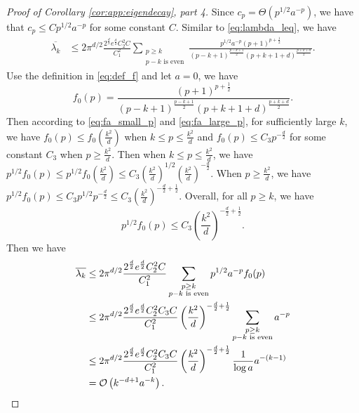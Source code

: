 \begin{proof}[Proof of Corollary \ref{cor:app:eigendecay}, part 4]
Since $c_p = \Theta(p^{1/2} a^{-p})$, 
 we have that $c_p\leq C p^{1/2} a^{-p}$ for some constant $C$. 
Similar to \eqref{eq:lambda_leq}, we have
\begin{align}
\overline{\lambda_k} 
&\leq 2\pi^{d/2}\frac{2^{\frac{d}{2}}e^{\frac{d}{2}}C_2^2C}{C_1^2}\sum_{\substack{p\geq k\\p-k\text{ is even}}} \frac{  p^{1/2} a^{-p}\left({p+1}\right)^{p+\frac{1}{2}}}{\left({p-k+1}\right)^{\frac{p-k+1}{2}}\left({p+k+1+d}\right)^{\frac{p+k+d}{2}}}.
\end{align}
Use the definition in \eqref{eq:def_f} and let $a=0$, we have
\begin{equation}
f_0(p)=\frac{\left({p+1}\right)^{p+\frac{1}{2}}}{\left({p-k+1}\right)^{\frac{p-k+1}{2}}\left({p+k+1+d}\right)^{\frac{p+k+d}{2}}}. 
\end{equation}
Then according to \eqref{eq:fa_small_p} and \eqref{eq:fa_large_p}, for sufficiently large $k$, we have $f_0(p)\leq f_0\left(\frac{k^2}{d}\right)$ when $k\leq p \leq \frac{k^2}{d}$ and $f_0(p)\leq C_3p^{-\frac{d}{2}}$ for some constant $C_3$ when $p\geq \frac{k^2}{d}$. Then when $k\leq p \leq \frac{k^2}{d}$, we have $p^{1/2}f_0(p)\leq p^{1/2} f_0\left(\frac{k^2}{d}\right)\leq C_3 \left(\frac{k^2}{d}\right)^{1/2} \left(\frac{k^2}{d}\right)^{-\frac{d}{2}}$. When $p\geq \frac{k^2}{d}$, we have $p^{1/2}f_0(p)\leq C_3 p^{1/2}p^{-\frac{d}{2}}\leq C_3\left(\frac{k^2}{d}\right)^{-\frac{d}{2}+\frac{1}{2}}$. Overall, for all $p\geq k$, we have
\begin{equation}
p^{1/2}f_0(p)\leq  C_3 \left(\frac{k^2}{d}\right)^{-\frac{d}{2}+\frac{1}{2}}.
\end{equation}
Then we have 
\begin{align}
\overline{\lambda_k} 
&\leq 2\pi^{d/2}\frac{2^{\frac{d}{2}}e^{\frac{d}{2}}C_2^2C}{C_1^2}\sum_{\substack{p\geq k\\p-k\text{ is even}}} p^{1/2} a^{-p}f_0(p)\\
&\leq 2\pi^{d/2}\frac{2^{\frac{d}{2}}e^{\frac{d}{2}}C_2^2C_3C}{C_1^2}\left(\frac{k^2}{d}\right)^{-\frac{d}{2}+\frac{1}{2}}\sum_{\substack{p\geq k\\p-k\text{ is even}}}  a^{-p}\\
&\leq 2\pi^{d/2}\frac{2^{\frac{d}{2}}e^{\frac{d}{2}}C_2^2C_3C}{C_1^2}\left(\frac{k^2}{d}\right)^{-\frac{d}{2}+\frac{1}{2}}\frac{1}{\log a}a^{-(k-1)}\\
&=\mathcal{O}\left(k^{-d+1}a^{-k} \right).
\end{align}

\end{proof}
